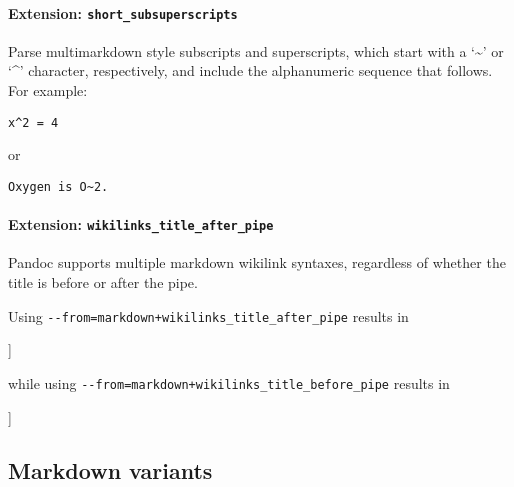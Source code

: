 \documentclass[
  a4paper,
]{article}
\newenvironment{Shaded}{}{}
\newcommand{\NormalTok}[1]{#1}
\begin{document}
\hypertarget{extension-short_subsuperscripts}{%
\paragraph{\texorpdfstring{Extension:
\texttt{short\_subsuperscripts}}{Extension: short\_subsuperscripts}}\label{extension-short_subsuperscripts}}

Parse multimarkdown style subscripts and superscripts, which start with
a `\textasciitilde{}' or `\^{}' character, respectively, and include the
alphanumeric sequence that follows. For example:

\begin{verbatim}
x^2 = 4
\end{verbatim}

or

\begin{verbatim}
Oxygen is O~2.
\end{verbatim}

\hypertarget{extension-wikilinks_title_after_pipe}{%
\paragraph{\texorpdfstring{Extension:
\texttt{wikilinks\_title\_after\_pipe}}{Extension: wikilinks\_title\_after\_pipe}}\label{extension-wikilinks_title_after_pipe}}

Pandoc supports multiple markdown wikilink syntaxes, regardless of
whether the title is before or after the pipe.

Using \texttt{-\/-from=markdown+wikilinks\_title\_after\_pipe} results
in

\begin{Shaded}
\begin{Highlighting}[]
\NormalTok{[[URL|title]]}
\end{Highlighting}
\end{Shaded}

while using \texttt{-\/-from=markdown+wikilinks\_title\_before\_pipe}
results in

\begin{Shaded}
\begin{Highlighting}[]
\NormalTok{[[title|URL]]}
\end{Highlighting}
\end{Shaded}

\hypertarget{markdown-variants}{%
\subsection{Markdown variants}\label{markdown-variants}}
\end{document}

